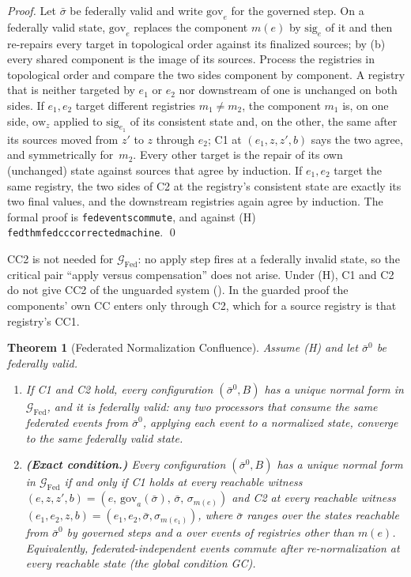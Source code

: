 \documentclass[11pt,a4paper]{article}
\theoremstyle{plain}
\newtheorem{theorem}{Theorem}[section]
\theoremstyle{definition}
\theoremstyle{remark}
\newcommand{\Fed}{\mathrm{Fed}}
\renewcommand{\_}{\textunderscore\allowbreak}
\begin{document}
\begin{proof}
Let $\bar{\sigma}$ be federally valid and write $\mathrm{gov}_e$ for the
governed step.  On a federally valid state, $\mathrm{gov}_e$ replaces the
component $m(e)$ by $\mathrm{sig}_e$ of it and then re-repairs every target in
topological order against its finalized sources; by (b)
every shared component is the image of its sources.  Process the registries in
topological order and compare the two sides component by component.  A
registry that is neither targeted by $e_1$ or $e_2$ nor downstream of one is
unchanged on both sides.  If $e_1, e_2$ target different registries
$m_1 \neq m_2$, the component $m_1$ is, on one side, $\mathrm{ow}_z$ applied to
$\mathrm{sig}_{e_1}$ of its consistent state and, on the other, the same after
its sources moved from $z'$ to $z$ through $e_2$; C1 at $(e_1, z, z', b)$ says
the two agree, and symmetrically for~$m_2$.  Every other target is the repair of
its own (unchanged) state against sources that agree by induction.  If $e_1,
e_2$ target the same registry, the two sides of C2 at the registry's consistent
state are exactly its two final values, and the downstream registries again
agree by induction.  The formal proof is \texttt{fed\_events\_commute}, and
against (H) \texttt{fed\_thm\_fed\_cc\_corrected\_machine}. \qed
\end{proof}

CC2 is not needed for $\mathcal{G}_\Fed$: no apply step fires at a federally
invalid state, so the critical pair ``apply versus compensation'' does not
arise.  Under (H), C1 and C2 do not give CC2 of the unguarded system
().  In the guarded proof the components' own CC enters only
through C2, which for a source registry is that registry's CC1.

\begin{theorem}[Federated Normalization Confluence]
\label{thm:fed-convergence}
Assume (H) and let $\bar{\sigma}^0$ be federally valid.
\begin{enumerate}[leftmargin=*,nosep,label=(\alph*)]
\item If C1 and C2 hold, every configuration $(\bar{\sigma}^0, B)$ has a unique
  normal form in $\mathcal{G}_\Fed$, and it is federally valid: any two
  processors that consume the same federated events from $\bar{\sigma}^0$,
  applying each event to a normalized state, converge to the same federally
  valid state.
\item \textbf{(Exact condition.)}  Every configuration $(\bar{\sigma}^0, B)$ has
  a unique normal form in $\mathcal{G}_\Fed$ if and only if C1 holds at every
  \emph{reachable witness} $(e, z, z', b) = (e,\, \mathrm{gov}_a(\bar{\sigma}),\,
  \bar{\sigma},\, \sigma_{m(e)})$ and C2 at every reachable witness
  $(e_1, e_2, z, b) = (e_1, e_2, \bar{\sigma}, \sigma_{m(e_1)})$, where
  $\bar{\sigma}$ ranges over the states reachable from $\bar{\sigma}^0$ by
  governed steps and $a$ over events of registries other than $m(e)$.
  Equivalently, federated-independent events commute after re-normalization at
  every reachable state (the global condition GC).
\end{enumerate}
\end{theorem}
\end{document}
